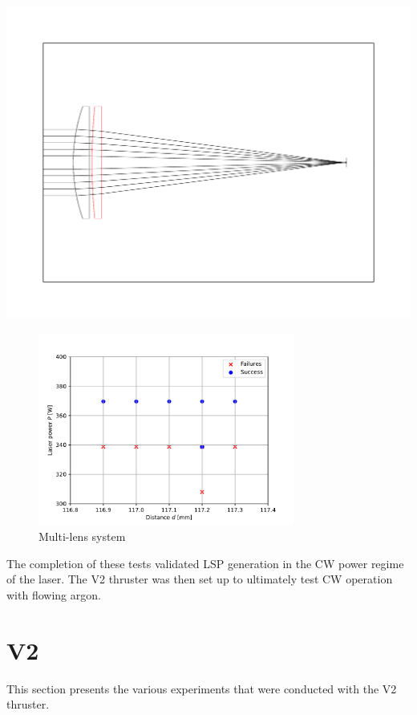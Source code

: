             \includegraphics[width=\textwidth]{assets/5 results/500 and 150 lenses.pdf}

            \begin{figure}[h]
                \centering
                \includegraphics[width=0.75\textwidth]{assets/5 results/duallens_focus_threshold.pdf}
                \caption{Multi-lens system}
            \end{figure}


            The completion of these tests validated LSP generation in the CW power regime of the laser. The V2 thruster was then set up to ultimately test CW operation with flowing argon.

    \section{V2}
        This section presents the various experiments that were conducted with the V2 thruster.
    
